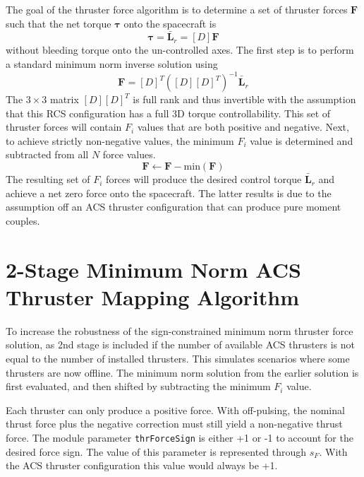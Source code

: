 \documentclass[]{BasiliskReportMemo}
\begin{document}
The goal of the thruster force algorithm is to determine a set of thruster forces $\bm F$ such that the net torque $\bm \tau$ onto the spacecraft is
\begin{equation}
	\label{eq:th:2}
	\bm\tau = \bar{\bm L}_{r}  = [D]\bm F
\end{equation}
without bleeding torque onto the un-controlled axes.  The first step is to perform a standard minimum norm inverse solution using
\begin{equation}
	\label{eq:th:min}
	\bm F = [D]^{T}([D][D]^{T})^{-1} \bar{\bm L}_{r}
\end{equation}
The $3\times 3$ matrix $[D][D]^{T}$ is full rank and thus invertible with the assumption that this RCS configuration has a full 3D torque controllability.  This set of  thruster forces will contain $F_{i}$ values that are both positive and negative.  Next, to achieve strictly non-negative values, the minimum $F_{i}$ value is determined and subtracted from all $N$ force values.  
\begin{equation}
	\bm F \leftarrow \bm F -  \text{min}(\bm F)
\end{equation}
The resulting set of $F_{i}$ forces will produce the desired control torque $\bar{\bm L}_{r}$ and achieve a net zero force onto the spacecraft.  The latter results is due to the assumption off an ACS thruster configuration that can produce pure moment couples.  



\section{2-Stage Minimum Norm ACS Thruster Mapping Algorithm}
To increase the robustness of the sign-constrained minimum norm thruster force solution, as 2nd stage is included if the number of available ACS thrusters is not equal to the number of installed thrusters.  This simulates scenarios where some thrusters are now offline.    The minimum norm solution from the earlier solution is first evaluated, and then shifted by subtracting the minimum $F_{i}$ value.  

Each thruster can only produce a positive force.  With off-pulsing, the nominal thrust force plus the negative correction must still yield a non-negative thrust force.  The module parameter {\tt thrForceSign} is either +1 or -1 to account for the desired force sign.  The value of this parameter is represented through $s_{F}$.  With the ACS thruster configuration this value would always be +1.  
\end{document}
